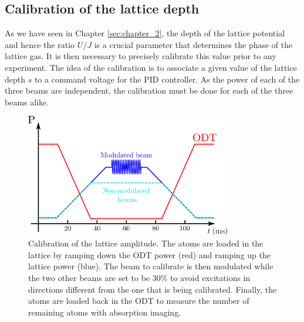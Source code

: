  
\subsection{Calibration of the lattice depth}

As we have seen in Chapter \ref{sec:chapter_2}, the depth of the lattice potential and hence the ratio $U/J$ is a crucial parameter that determines the phase of the lattice gas. It is then necessary to precisely calibrate this value prior to any experiment. The idea of the calibration is to associate a given value of the lattice depth $s$ to a command voltage for the PID controller. As the power of each of the three beams are independent, the calibration must be done for each of the three beams alike. 

\begin{figure}
    \centering
    \includegraphics[width=0.8\textwidth]{Fig/Chapter3/modulation.png}
    \caption{Calibration of the lattice amplitude. The atoms are loaded in the lattice by ramping down the ODT power (red) and ramping up the lattice power (blue). The beam to calibrate is then modulated while the two other beams are set to be $30 \%$ to avoid excitations in directions different from the one that is being calibrated. Finally, the atoms are loaded back in the ODT to measure the number of remaining atoms with absorption imaging.}
    \label{fig:calib_process}
\end{figure}

